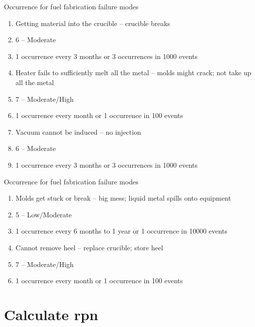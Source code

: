 \documentclass[aspectratio=1610,pdftex,dvipsnames,compress,xcolor={dvipsnames}]{beamer}
\newcommand{\acf}{\acrfull} %
\begin{document}
\begin{frame}{Occurrence for fuel fabrication failure modes}
    \begin{enumerate}[series=outerlist,topsep=0pt,itemsep=3pt,leftmargin=*,label=(\arabic*)]
        \item[]Getting material into the crucible -- crucible breaks
        \item[]6 -- Moderate
        \item[]1 occurrence every 3 months or 3 occurrences in 1000 events
            \vspace{0.10in}
        \item[]Heater fails to sufficiently melt all the metal -- molds might crack; not take up all the metal
        \item[]7 -- Moderate/High
        \item[]1 occurrence every month or 1 occurrence in 100 events
            \vspace{0.10in}
        \item[]Vacuum cannot be induced -- no injection
        \item[]6 -- Moderate
        \item[]1 occurrence every 3 months or 3 occurrences in 1000 events
    \end{enumerate}
\end{frame}


\begin{frame}{Occurrence for fuel fabrication failure modes}
    \begin{enumerate}[series=outerlist,topsep=0pt,itemsep=3pt,leftmargin=*,label=(\arabic*)]
        \item[]Molds get stuck or break -- big mess; liquid metal spills onto equipment
        \item[]5 -- Low/Moderate
        \item[]1 occurrence every 6 months to 1 year or 1 occurrence in 10000 events
            \vspace{0.10in}
        \item[]Cannot remove heel -- replace crucible; store heel
        \item[]7 -- Moderate/High
        \item[]1 occurrence every month or 1 occurrence in 100 events
    \end{enumerate}
\end{frame}


\section{Calculate \acf{rpn}}
\end{document}
